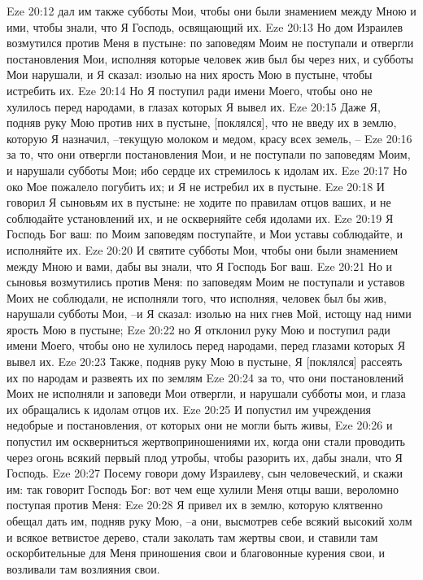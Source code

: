 Eze 20:12  дал им также субботы Мои, чтобы они были знамением между Мною и ими, чтобы знали, что Я Господь, освящающий их.
Eze 20:13  Но дом Израилев возмутился против Меня в пустыне: по заповедям Моим не поступали и отвергли постановления Мои, исполняя которые человек жив был бы через них, и субботы Мои нарушали, и Я сказал: изолью на них ярость Мою в пустыне, чтобы истребить их.
Eze 20:14  Но Я поступил ради имени Моего, чтобы оно не хулилось перед народами, в глазах которых Я вывел их.
Eze 20:15  Даже Я, подняв руку Мою против них в пустыне, [поклялся], что не введу их в землю, которую Я назначил, --текущую молоком и медом, красу всех земель, --
Eze 20:16  за то, что они отвергли постановления Мои, и не поступали по заповедям Моим, и нарушали субботы Мои; ибо сердце их стремилось к идолам их.
Eze 20:17  Но око Мое пожалело погубить их; и Я не истребил их в пустыне.
Eze 20:18  И говорил Я сыновьям их в пустыне: не ходите по правилам отцов ваших, и не соблюдайте установлений их, и не оскверняйте себя идолами их.
Eze 20:19  Я Господь Бог ваш: по Моим заповедям поступайте, и Мои уставы соблюдайте, и исполняйте их.
Eze 20:20  И святите субботы Мои, чтобы они были знамением между Мною и вами, дабы вы знали, что Я Господь Бог ваш.
Eze 20:21  Но и сыновья возмутились против Меня: по заповедям Моим не поступали и уставов Моих не соблюдали, не исполняли того, что исполняя, человек был бы жив, нарушали субботы Мои, --и Я сказал: изолью на них гнев Мой, истощу над ними ярость Мою в пустыне;
Eze 20:22  но Я отклонил руку Мою и поступил ради имени Моего, чтобы оно не хулилось перед народами, перед глазами которых Я вывел их.
Eze 20:23  Также, подняв руку Мою в пустыне, Я [поклялся] рассеять их по народам и развеять их по землям
Eze 20:24  за то, что они постановлений Моих не исполняли и заповеди Мои отвергли, и нарушали субботы мои, и глаза их обращались к идолам отцов их.
Eze 20:25  И попустил им учреждения недобрые и постановления, от которых они не могли быть живы,
Eze 20:26  и попустил им оскверниться жертвоприношениями их, когда они стали проводить через огонь всякий первый плод утробы, чтобы разорить их, дабы знали, что Я Господь.
Eze 20:27  Посему говори дому Израилеву, сын человеческий, и скажи им: так говорит Господь Бог: вот чем еще хулили Меня отцы ваши, вероломно поступая против Меня:
Eze 20:28  Я привел их в землю, которую клятвенно обещал дать им, подняв руку Мою, --а они, высмотрев себе всякий высокий холм и всякое ветвистое дерево, стали заколать там жертвы свои, и ставили там оскорбительные для Меня приношения свои и благовонные курения свои, и возливали там возлияния свои.
